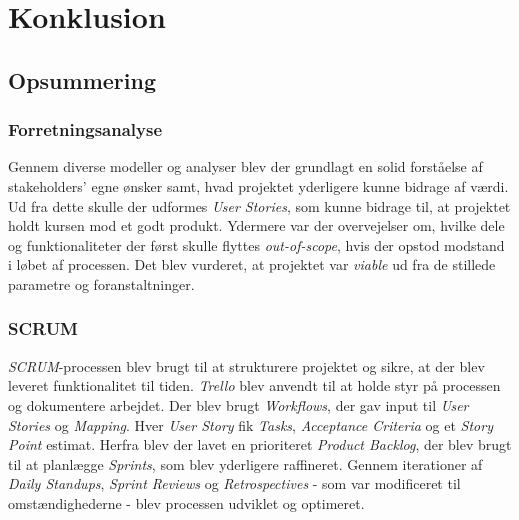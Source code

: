 \chapter{Konklusion}
\label{chapter:conclusion}

\section{Opsummering}
\label{sec:conclusion_summary}

\subsection{Forretningsanalyse}
Gennem diverse modeller og analyser blev der grundlagt en solid forståelse af stakeholders' egne ønsker samt, hvad projektet yderligere kunne bidrage af værdi. 
Ud fra dette skulle der udformes \emph{User Stories}, som kunne bidrage til, at projektet holdt kursen mod et godt produkt. 
Ydermere var der overvejelser om, hvilke dele og funktionaliteter der først skulle flyttes \emph{out-of-scope}, hvis der opstod modstand i løbet af processen.
Det blev vurderet, at projektet var \emph{viable} ud fra de stillede parametre og foranstaltninger. 

\subsection{SCRUM}
\emph{SCRUM}-processen blev brugt til at strukturere projektet og sikre, at der blev leveret funktionalitet til tiden.
\emph{Trello} blev anvendt til at holde styr på processen og dokumentere arbejdet.
Der blev brugt \emph{Workflows}, der gav input til \emph{User Stories} og \emph{Mapping}. Hver \emph{User Story} fik \emph{Tasks}, \emph{Acceptance Criteria} og et \emph{Story Point} estimat.
Herfra blev der lavet en prioriteret \emph{Product Backlog}, der blev brugt til at planlægge \emph{Sprints}, som blev yderligere raffineret.
Gennem iterationer af \emph{Daily Standups}, \emph{Sprint Reviews} og \emph{Retrospectives} - som var modificeret til omstændighederne - blev processen udviklet og optimeret.

